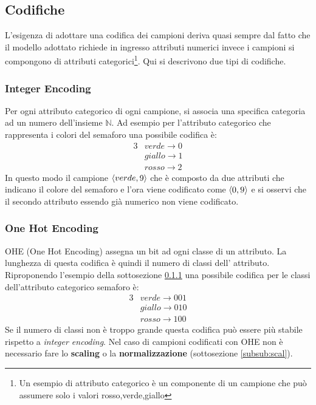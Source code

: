 \subsection{Codifiche}
L'esigenza di adottare una codifica dei campioni deriva quasi sempre dal fatto che il modello adottato richiede in ingresso attributi numerici invece i campioni si compongono di attributi categorici\footnote{Un esempio di attributo categorico è un componente di un campione che può assumere solo i valori rosso,verde,giallo}. Qui si descrivono due tipi di codifiche.
\subsubsection{Integer Encoding}
\label{subsub:ien} 
Per ogni attributo categorico di ogni campione, si associa una specifica categoria ad un numero dell'insieme $\mathbb{N}$.
Ad esempio per l'attributo categorico che rappresenta i colori del semaforo una possibile codifica è:
\begin{alignat}{3}
&verde \to 0 \\
&giallo \to 1\\
&rosso \to 2
\end{alignat} 
In questo modo il campione $\Braket{verde , 9}$ che è composto da due attributi che indicano il colore del semaforo e l'ora viene codificato come $\Braket{0 , 9}$ e si osservi che il secondo attributo essendo già numerico non viene codificato.
\subsubsection{One Hot Encoding}
\ac{OHE} (One Hot Encoding) assegna un bit ad ogni classe di un attributo. La lunghezza di questa codifica è quindi il numero di classi dell' attributo. Riproponendo l'esempio della sottosezione \ref{subsub:ien} una possibile codifica per le classi dell'attributo categorico semaforo è:
\begin{alignat}{3}
&verde \to 0 0 1\\
&giallo \to 0 1 0\\
&rosso \to 1 0 0
\end{alignat}
Se il numero di classi non è troppo grande questa codifica può essere più stabile rispetto a \textit{integer encoding}.  
Nel caso di campioni codificati con \ac{OHE} non è necessario fare lo \textbf{scaling} o la \textbf{normalizzazione} (sottosezione \ref{subsub:scal}).

